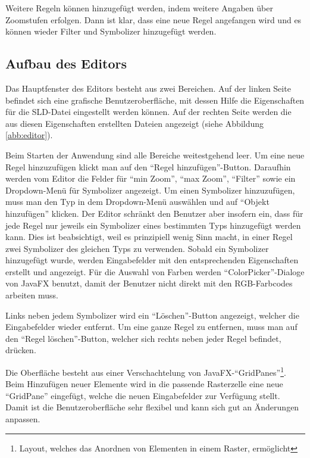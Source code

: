Weitere Regeln können hinzugefügt werden, indem weitere Angaben über Zoomstufen erfolgen. Dann ist klar, dass eine neue Regel angefangen wird und es können wieder Filter und Symbolizer hinzugefügt werden. 

\subsection{Aufbau des Editors}
Das Hauptfenster des Editors besteht aus zwei Bereichen. Auf der linken Seite befindet sich eine grafische Benutzeroberfläche, mit dessen Hilfe die Eigenschaften für die SLD-Datei eingestellt werden können. Auf der rechten Seite werden die aus diesen Eigenschaften erstellten Dateien angezeigt (siehe Abbildung \ref{abb:editor}). 

Beim Starten der Anwendung sind alle Bereiche weitestgehend leer. Um eine neue Regel hinzuzufügen klickt man auf den \enquote{Regel hinzufügen}-Button. Daraufhin werden vom Editor die Felder für \enquote{min Zoom}, \enquote{max Zoom}, \enquote{Filter} sowie ein Dropdown-Menü für Symbolizer angezeigt. Um einen Symbolizer hinzuzufügen, muss man den Typ in dem Dropdown-Menü auswählen und auf \enquote{Objekt hinzufügen} klicken. Der Editor schränkt den Benutzer aber insofern ein, dass für jede Regel nur jeweils ein Symbolizer eines bestimmten Typs hinzugefügt werden kann. Dies ist beabsichtigt, weil es prinzipiell wenig Sinn macht, in einer Regel zwei Symbolizer des gleichen Typs zu verwenden. 
Sobald ein Symbolizer hinzugefügt wurde, werden Eingabefelder mit den entsprechenden Eigenschaften erstellt und angezeigt. Für die Auswahl von Farben werden \enquote{ColorPicker}-Dialoge von JavaFX benutzt, damit der Benutzer nicht direkt mit den RGB-Farbcodes arbeiten muss. 

Links neben jedem Symbolizer wird ein \enquote{Löschen}-Button angezeigt, welcher die Eingabefelder wieder entfernt. Um eine ganze Regel zu entfernen, muss man auf den \enquote{Regel löschen}-Button, welcher sich rechts neben jeder Regel befindet, drücken.

Die Oberfläche besteht aus einer Verschachtelung von JavaFX-\enquote{GridPanes}\footnote{Layout, welches das Anordnen von Elementen in einem Raster, ermöglicht}. Beim Hinzufügen neuer Elemente wird in die passende Rasterzelle eine neue \enquote{GridPane} eingefügt, welche die neuen Eingabefelder zur Verfügung stellt. Damit ist die Benutzeroberfläche sehr flexibel und kann sich gut an Änderungen anpassen.

